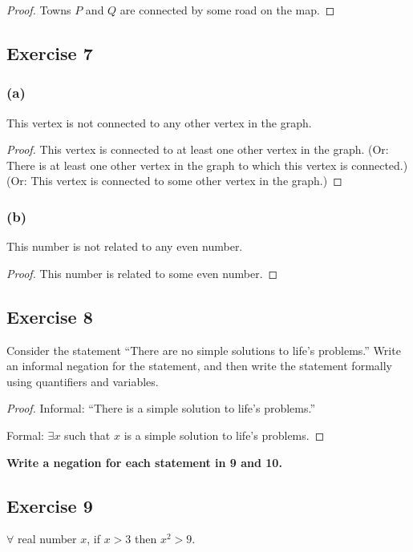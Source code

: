 \documentclass[14pt]{extarticle}
\newcommand{\fa}{\forall}
\newcommand{\te}{\exists}
\begin{document}
\begin{proof}
    Towns $P$ and $Q$ are connected by some road on the map.
\end{proof}

\subsection{Exercise 7}

\subsubsection{(a)}
This vertex is not connected to any other vertex in the graph.

\begin{proof}
    This vertex is connected to at least one other vertex in the graph. (Or: There is at least one other vertex in the graph to which this vertex is connected.) (Or: This vertex is connected to some other vertex in the graph.)
\end{proof}

\subsubsection{(b)}
This number is not related to any even number.

\begin{proof}
    This number is related to some even number.
\end{proof}

\subsection{Exercise 8}
Consider the statement “There are no simple solutions to life’s problems.” Write an informal negation for the statement, and then write the statement formally using quantifiers and variables.

\begin{proof}
    Informal: “There is a simple solution to life’s problems.”

    Formal: $\te x$ such that $x$ is a simple solution to life's problems.
\end{proof}

{\bf \color{cyan}Write a negation for each statement in 9 and 10.}

\subsection{Exercise 9}
$\fa$ real number $x$, if $x > 3$ then $x^2 > 9$.
\end{document}
